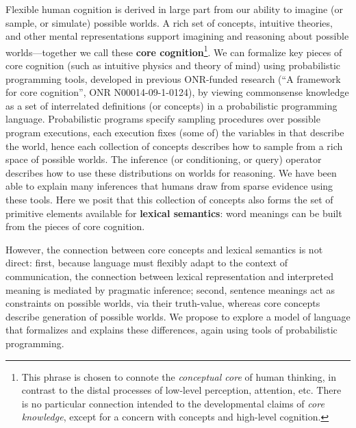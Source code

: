 \documentclass[12pt]{article}
\newcounter{definition}
\begin{document}
Flexible human cognition is derived in large part from our ability to imagine (or sample, or simulate) possible worlds. A rich set of concepts, intuitive theories, and other mental representations support imagining and reasoning about possible worlds---together we call these {\bf core cognition}\footnote{This phrase is chosen to connote the \emph{conceptual core} of human thinking, in contrast to the distal processes of low-level perception, attention, etc. There is no particular connection intended to the developmental claims of \emph{core knowledge}, except for a concern with concepts and high-level cognition.}. We can formalize key pieces of core cognition (such as intuitive physics and theory of mind) using probabilistic programming tools, developed in previous ONR-funded research  (``A framework for core cognition'', ONR N00014-09-1-0124), by viewing commonsense knowledge as a set of interrelated definitions (or concepts) in a probabilistic programming language. Probabilistic programs specify sampling procedures over possible program executions, each execution fixes (some of) the variables in that describe the world, hence each collection of concepts describes how to sample from a rich space of possible worlds. The inference (or conditioning, or query) operator describes how to use these distributions on worlds for reasoning.
We have been able to explain many inferences that humans draw from sparse evidence using these tools. Here we posit that this collection of concepts also forms the set of primitive elements available for {\bf lexical semantics}: word meanings can be built from the pieces of core cognition.

However, the connection between core concepts and lexical semantics is not direct: 
first, 
because language must flexibly adapt to the context of communication, the connection between lexical representation and interpreted meaning is mediated by pragmatic inference;
second, 
sentence meanings act as constraints on possible worlds, via their truth-value, whereas core concepts describe generation of possible worlds.
%
%
We propose to explore a model of language that formalizes and explains these differences, again using tools of probabilistic programming. 
\end{document}
